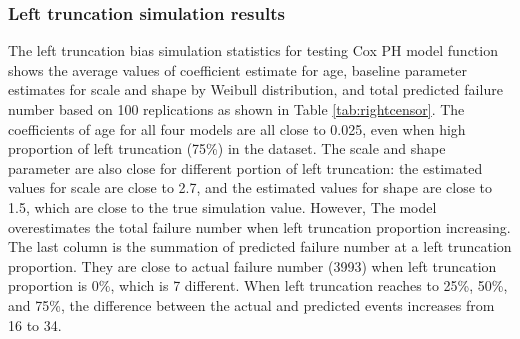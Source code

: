 \documentclass[12pt,letterpaper]{article}
\begin{document}
\subsubsection{Left truncation simulation results}
The left truncation bias simulation statistics for testing Cox PH model function shows the average values of coefficient estimate for age, baseline parameter estimates for scale and shape by Weibull distribution, and total predicted failure number based on 100 replications as shown in Table \ref{tab:rightcensor}. The coefficients of age for all four models are all close to 0.025, even when high proportion of left truncation (75\%) in the dataset. The scale and shape parameter are also close for different portion of left truncation: the estimated values for scale are close to 2.7, and the estimated values for shape are close to 1.5, which are close to the true simulation value. However, The model overestimates the total failure number when left truncation proportion increasing. The last column is the summation of predicted failure number at a left truncation proportion. They are close to actual failure number (3993) when left truncation proportion is 0\%, which is 7 different. When left truncation reaches to 25\%, 50\%, and 75\%, the difference between the actual and predicted events increases from 16 to 34. 
\end{document}
